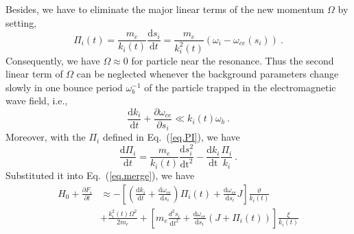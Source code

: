 Besides, we have to eliminate the major linear terms of the new momentum $\Omega$ by setting, 
\begin{equation}\label{eq.PI}
    \Pi_i(t) = \frac{m_e}{k_i(t)}\frac{\mathrm{d} s_i}{\mathrm{d} t} = \frac{m_e}{k_i^2(t)}(\omega_i - \omega_{ce}(s_i))~.
\end{equation}
Consequently, we have $\Omega \approx 0$ for particle near the resonance.
Thus the second linear term of $\Omega$ can be neglected whenever the background parameters change slowly in one bounce period $\omega_b^{-1}$ of the particle trapped in the electromagnetic wave field, i.e.,
\begin{equation}
    \frac{\mathrm{d} k_i}{\mathrm{d} t} + \frac{\partial \omega_{ce}}{\partial s_i} \ll k_i(t) \omega_b~.
\end{equation}
Moreover, with the $\Pi_i$ defined in Eq.~(\ref{eq.PI}), we have
\begin{equation}
    \frac{\mathrm{d}\Pi_i}{\mathrm{d}t} = \frac{m_e}{k_i(t)}\frac{\mathrm{d}s_i^2}{\mathrm{d t^2}} - \frac{\mathrm{d}k_i}{\mathrm{d t}}\frac{\Pi_i}{k_i}~.
\end{equation}
Substituted it into Eq.~(\ref{eq.merge}), we have 
\begin{equation}
    \begin{aligned}
        H_0 + \frac{\partial F_i}{\partial t} & \approx-\left[\left(\frac{\mathrm{d}k_{i}}{\mathrm{d}t}+\frac{\mathrm{d}\omega_{c e}}{\mathrm{d}s_{i}}\right) \Pi_{i}(t)+\frac{\mathrm{d}\omega_{c e}}{\mathrm{d}s_{i}} J\right] \frac{\vartheta}{k_{i}(t)} 
        \\
         & +\frac{k_{i}^{2}(t) \Omega^{2}}{2 m_{e}}+\left[m_{e} \frac{d^{2} s_{i}}{\mathrm{d}t^{2}}+\frac{\mathrm{d}\omega_{c e}}{\mathrm{d}s_{i}}\left(J+\Pi_{i}(t)\right)\right] \frac{\xi}{k_{i}(t)} 
    \end{aligned}
\end{equation}

